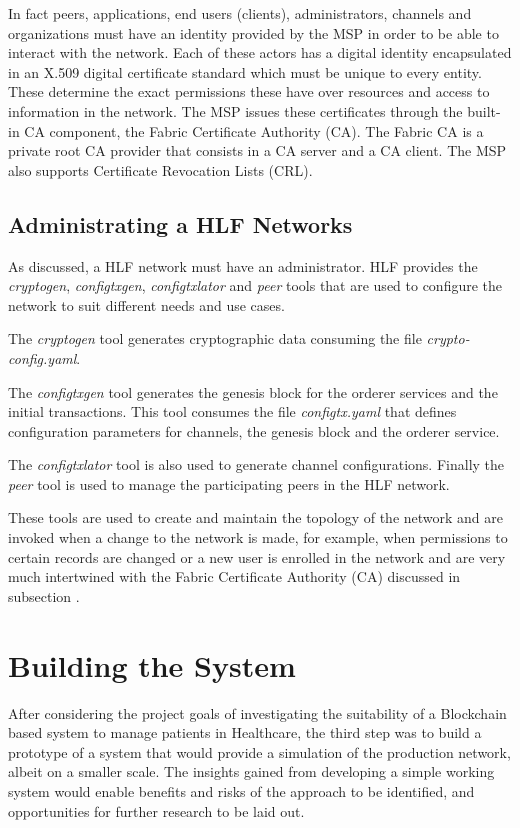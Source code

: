 In fact peers, applications, end users (clients), administrators, channels and
organizations must have an identity provided by the MSP in order to be able to
interact with the network. Each of these actors has a digital identity
encapsulated in an X.509 digital certificate standard which must be unique to
every entity. These determine the exact permissions these have over resources
and access to information in the network. The MSP issues these certificates
through the built-in CA component, the Fabric Certificate Authority (CA). The
Fabric CA is a private root CA provider that consists in a CA server and a CA
client. The MSP also supports Certificate Revocation Lists (CRL).

\subsection{Administrating a HLF Networks}


As discussed, a HLF network must have an administrator. HLF provides the
\textit{cryptogen}, \textit{configtxgen}, \textit{configtxlator} and
\textit{peer} tools that are used to configure the network to suit different
needs and use cases.

The \textit{cryptogen} tool generates cryptographic data consuming the file
\textit{crypto-config.yaml}.

The \textit{configtxgen} tool generates the genesis block for the orderer
services and the initial transactions.  This tool consumes the file
\textit{configtx.yaml} that defines configuration parameters for channels, the
genesis block and the orderer service.

The \textit{configtxlator} tool is also used to generate channel
configurations.  Finally the \textit{peer} tool is used to manage the
participating peers in the HLF network.

These tools are used to create and maintain the topology of the network and are
invoked when a change to the network is made, for example, when permissions to
certain records are changed or a new user is enrolled in the network and are
very much intertwined with the Fabric Certificate Authority (CA) discussed in
subsection .

\section{Building the System}

After considering the project goals of investigating the suitability of a
Blockchain based system to manage patients in Healthcare, the third step was to
build a prototype of a system that would provide a simulation of the production
network, albeit on a smaller scale. The insights gained from developing a
simple working system would enable benefits and risks of the approach to be
identified, and opportunities for further research to be laid out.

